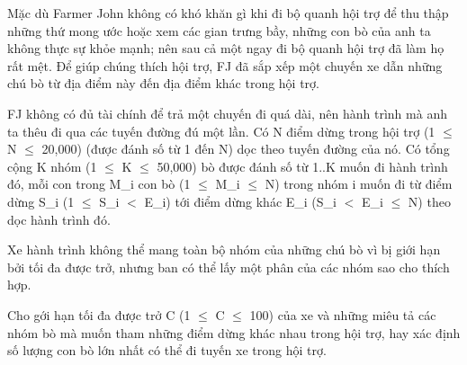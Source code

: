 Mặc dù Farmer John không có khó khăn gì khi đi bộ quanh hội trợ để thu thập những thứ mong ước hoặc xem các gian trưng bầy, những con bò của anh ta không thực sự khỏe mạnh; nên sau cả một ngay đi bộ quanh hội trợ đã làm họ rất mệt. Để giúp chúng thích hội trợ, FJ đã sắp xếp một chuyến xe dẫn những chú bò từ địa điểm này đến địa điểm khác trong hội trợ.  

   FJ không có đủ tài chính để trả một chuyến đi quá dài, nên hành trình mà  anh ta thêu đi qua các tuyến đường đú một lần. Có N điểm dừng trong hội  trợ (1  $\le$  N  $\le$  20,000) (được đánh số từ 1 đến N) dọc theo tuyến đường của  nó. Có tổng cộng K nhóm (1  $\le$  K  $\le$  50,000) bò được đánh số từ 1..K muốn đi hành trình đó, mỗi con trong M\_i con bò (1  $\le$  M\_i  $\le$  N) trong nhóm i  muốn đi từ điểm dừng S\_i (1  $\le$  S\_i $<$ E\_i) tới điểm dừng khác E\_i  (S\_i $<$ E\_i  $\le$  N) theo dọc hành trình đó.  

   Xe hành trình không thể mang toàn bộ nhóm của những chú bò vì bị giới hạn  bởi tối đa được trở, nhưng ban có thể lấy một phân của các nhóm sao cho thích hợp.   




   Cho gới hạn tối đa được trở C (1  $\le$  C  $\le$  100) của xe và những miêu tả các  nhóm bò mà muốn tham những điểm dừng khác nhau trong hội trợ, hay xác định  số lượng con bò lớn nhất có thể đi tuyến xe trong hội trợ.